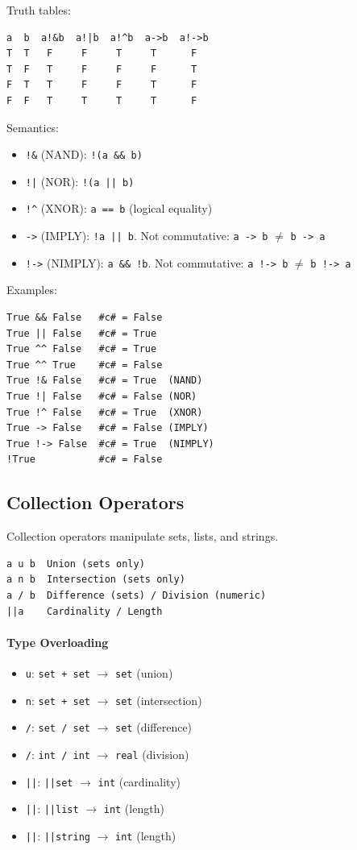 \documentclass{report}
\begin{document}
Truth tables:
\begin{verbatim}
a  b  a!&b  a!|b  a!^b  a->b  a!->b
T  T   F     F     T     T      F
T  F   T     F     F     F      T
F  T   T     F     F     T      F
F  F   T     T     T     T      F
\end{verbatim}

Semantics:
\begin{itemize}
\item \texttt{!\&} (NAND): \texttt{!(a \&\& b)}
\item \texttt{!|} (NOR): \texttt{!(a || b)}
\item \texttt{!}\texttt{\^{}} (XNOR): \texttt{a == b} (logical equality)
\item \texttt{->} (IMPLY): \texttt{!a || b}. Not commutative: \texttt{a -> b} $\neq$ \texttt{b -> a}
\item \texttt{!->} (NIMPLY): \texttt{a \&\& !b}. Not commutative: \texttt{a !-> b} $\neq$ \texttt{b !-> a}
\end{itemize}

Examples:
\begin{verbatim}
True && False   #c# = False
True || False   #c# = True
True ^^ False   #c# = True
True ^^ True    #c# = False
True !& False   #c# = True  (NAND)
True !| False   #c# = False (NOR)
True !^ False   #c# = True  (XNOR)
True -> False   #c# = False (IMPLY)
True !-> False  #c# = True  (NIMPLY)
!True           #c# = False
\end{verbatim}

\subsection{Collection Operators}
Collection operators manipulate sets, lists, and strings.
\begin{verbatim}
a u b  Union (sets only)
a n b  Intersection (sets only)
a / b  Difference (sets) / Division (numeric)
||a    Cardinality / Length
\end{verbatim}

\paragraph{Type Overloading}
\begin{itemize}
\item \texttt{u}: \texttt{set + set} $\rightarrow$ \texttt{set} (union)
\item \texttt{n}: \texttt{set + set} $\rightarrow$ \texttt{set} (intersection)
\item \texttt{/}: \texttt{set / set} $\rightarrow$ \texttt{set} (difference)
\item \texttt{/}: \texttt{int / int} $\rightarrow$ \texttt{real} (division)
\item \texttt{||}: \texttt{||set} $\rightarrow$ \texttt{int} (cardinality)
\item \texttt{||}: \texttt{||list} $\rightarrow$ \texttt{int} (length)
\item \texttt{||}: \texttt{||string} $\rightarrow$ \texttt{int} (length)
\end{itemize}
\end{document}
